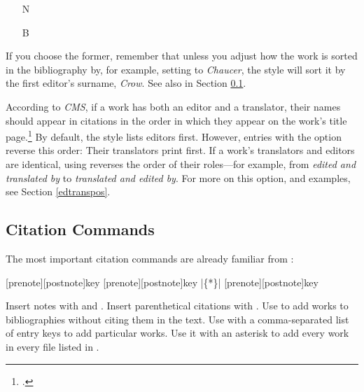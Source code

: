 \documentclass[11pt,letterpaper,oneside]{article}
\begin{document}
\begin{optionlist}
\begin{itemize}
\item[N] 

\item[B] 
\end{itemize}

\noindent If you choose the former, remember that unless you adjust
how the work is sorted in the bibliography by, for example, setting
 to \textit{Chaucer}, the style will sort it by the
first editor's surname, \textit{Crow}. See also  in Section
\ref{citecmds}.


According to \textit{CMS}, if a work has both an editor and a
translator, their names should appear in citations in the order in
which they appear on the work's title
page.\footcite[14.88]{chicago2010} By default, the style lists editors
first. However, entries with the option  reverse
this order: Their translators print first. If a work's translators and
editors are identical, using  reverses the order
of their roles---for example, from \textit{edited and translated by}
to \textit{translated and edited by}. For more on this option, and
examples, see Section \ref{edtranspos}.

\end{optionlist}

\subsection{Citation Commands}
\label{citecmds}

The most important citation commands are already familiar from
\biblatex:

\begin{ltxsyntax}

[prenote][postnote]{key}
[prenote][postnote]{key}
|\{*\}|
[prenote][postnote]{key}

\end{ltxsyntax}

\noindent Insert notes with  and . Insert
parenthetical citations with . Use  to add
works to bibliographies without citing them in the text. Use
 with a comma-separated list of entry keys to add
particular works. Use it with an asterisk to add every work in every
 file listed in .
\end{document}
